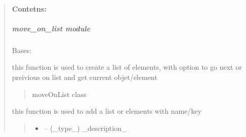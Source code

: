 \documentclass[letterpaper,10pt,english]{sphinxmanual}
\begin{document}
\begin{quote}
\paragraph{Contetns:}
\label{\detokenize{setting/utils Dir:contetns}}
\sphinxstepscope


\subparagraph{move\_on\_list module}
\label{\detokenize{setting/utils/move_on_list:module-oxin.utils.move_on_list}}\label{\detokenize{setting/utils/move_on_list:move-on-list-module}}\label{\detokenize{setting/utils/move_on_list::doc}}

\begin{savenotes}\begin{fulllineitems}
\label{\detokenize{setting/utils/move_on_list:oxin.utils.move_on_list.moveOnList}}
\pysigstartsignatures
{}
\pysigstopsignatures
\sphinxAtStartPar
Bases: 

\sphinxAtStartPar
this function is used to create a list of elements, with option to go next or preivious on list and
get current objet/element
\begin{quote}\begin{description}
\sphinxAtStartPar
moveOnList class

\end{description}\end{quote}

\begin{savenotes}\begin{fulllineitems}
\label{\detokenize{setting/utils/move_on_list:oxin.utils.move_on_list.moveOnList.add}}
\pysigstartsignatures
{}
\pysigstopsignatures
\sphinxAtStartPar
this function is used to add a list or elements with name/key
\begin{quote}\begin{description}
\begin{itemize}
\item {} 
\sphinxAtStartPar
{} – (\_type\_) \_description\_


\end{itemize}
\end{description}
\end{quote}
\end{fulllineitems}
\end{savenotes}
\end{fulllineitems}
\end{savenotes}
\end{quote}
\end{document}
